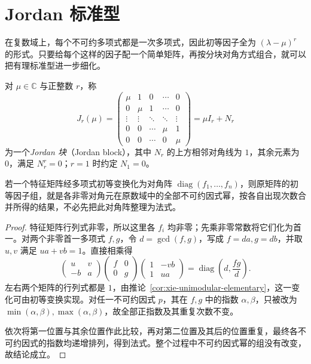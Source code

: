 \section{Jordan 标准型}
\label{sec:xie-jordan-canonical}

在复数域上，每个不可约多项式都是一次多项式，因此初等因子全为 $(\lambda-\mu)^r$ 的形式。只要给每个这样的因子配一个简单矩阵，再按分块对角方式组合，就可以把有理标准型进一步细化。

\begin{definition}
\label{def:xie-jordan-block}
对 $\mu\in\mathbb C$ 与正整数 $r$，称
\begin{equation}
\label{eq:xie-jordan-block}
    J_r(\mu)=\begin{pmatrix}
        \mu&1&0&\cdots&0\\
        0&\mu&1&\cdots&0\\
        \vdots&\vdots&\ddots&\ddots&\vdots\\
        0&0&\cdots&\mu&1\\
        0&0&\cdots&0&\mu
    \end{pmatrix}=\mu I_r+N_r
\end{equation}
为一个\emph{Jordan 块}（Jordan block），其中 $N_r$ 的上方相邻对角线为 $1$，其余元素为 $0$，满足 $N_r^r=0$；$r=1$ 时约定 $N_1=0$。
\end{definition}

\begin{lemma}
\label{lem:xie-diagonal-elementary}
若一个特征矩阵经多项式初等变换化为对角阵 $\operatorname{diag}(f_1,\ldots,f_n)$，则原矩阵的初等因子组，就是各非零对角元在原数域中的全部不可约因式幂，按各自出现次数合并所得的结果，不必先把此对角阵整理为法式。
\end{lemma}
\begin{proof}
特征矩阵行列式非零，所以这里各 $f_i$ 均非零；先乘非零常数将它们化为首一。对两个非零首一多项式 $f,g$，令 $d=\gcd(f,g)$，写成 $f=da,g=db$，并取 $u,v$ 满足 $ua+vb=1$。直接相乘得
\[
    \begin{pmatrix}u&v\\-b&a\end{pmatrix}
    \begin{pmatrix}f&0\\0&g\end{pmatrix}
    \begin{pmatrix}1&-vb\\1&ua\end{pmatrix}
    =\operatorname{diag}\left(d,\frac{fg}{d}\right).
\]
左右两个矩阵的行列式都是 $1$，由推论~\ref{cor:xie-unimodular-elementary}，这一变化可由初等变换实现。对任一不可约因式 $p$，其在 $f,g$ 中的指数 $\alpha,\beta$，只被改为 $\min(\alpha,\beta),\max(\alpha,\beta)$，故全部正指数及其重复次数不变。

依次将第一位置与其余位置作此比较，再对第二位置及其后的位置重复，最终各不可约因式的指数均递增排列，得到法式。整个过程中不可约因式幂的组没有改变，故结论成立。
\end{proof}

